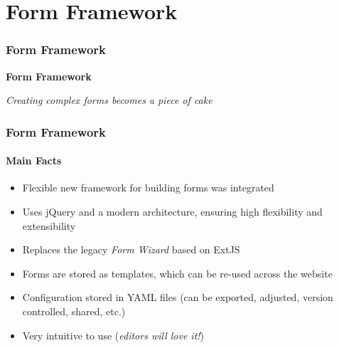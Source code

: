 %

\section{Form Framework}
\begin{frame}[fragile]
	\frametitle{Form Framework}

	\begin{center}\huge{\color{typo3darkgrey}\textbf{Form Framework}}\end{center}
	\begin{center}\large{\textit{Creating complex forms becomes a piece of cake}}\end{center}

\end{frame}

\begin{frame}[fragile]
	\frametitle{Form Framework}
	\framesubtitle{Main Facts}

	\begin{itemize}
		\item Flexible new framework for building forms was integrated
		\item Uses jQuery and a modern architecture, ensuring high flexibility and extensibility
		\item Replaces the legacy \textit{Form Wizard} based on ExtJS
		\item Forms are stored as templates, which can be re-used across the website
		\item Configuration stored in YAML files\newline
			\small(can be exported, adjusted, version controlled, shared, etc.)\normalsize
		\item Very intuitive to use (\textit{editors will love it!})
	\end{itemize}

\end{frame}

